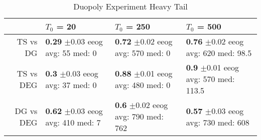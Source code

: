 \documentclass[../competing_bandits.tex]{subfiles}
\begin{document}
\begin{table}[ht]
\centering
\caption{Duopoly Experiment Heavy Tail}
\begin{tabular}{rlll}
  \hline
 & $T_0$ = 20 & $T_0$ = 250 & $T_0$ = 500 \\ 
  \hline
TS vs DG & \makecell{\textbf{0.29} $\pm$0.03\\ eeog \\ avg: 55\\ med: 0} & \makecell{\textbf{0.72} $\pm$0.02\\ eeog \\ avg: 570\\ med: 0} & \makecell{\textbf{0.76} $\pm$0.02\\ eeog \\ avg: 620\\ med: 98.5} \\ 
  TS vs DEG & \makecell{\textbf{0.3} $\pm$0.03\\ eeog \\ avg: 37\\ med: 0} & \makecell{\textbf{0.88} $\pm$0.01\\ eeog \\ avg: 480\\ med: 0} & \makecell{\textbf{0.9} $\pm$0.01\\ eeog \\ avg: 570\\ med: 113.5} \\ 
  DG vs DEG & \makecell{\textbf{0.62} $\pm$0.03\\ eeog \\ avg: 410\\ med: 7} & \makecell{\textbf{0.6} $\pm$0.02\\ eeog \\ avg: 790\\ med: 762} & \makecell{\textbf{0.57} $\pm$0.03\\ eeog \\ avg: 730\\ med: 608} \\ 
   \hline
\end{tabular}
\label{sim_ht}
\end{table}
\end{document}
